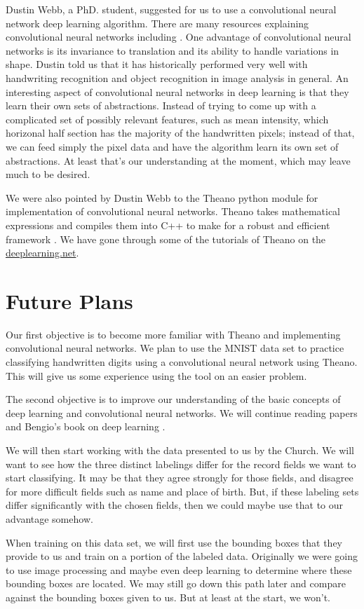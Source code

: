 \documentclass[12pt]{article}
\begin{document}
Dustin Webb, a PhD. student, suggested for us to use a convolutional neural network deep learning algorithm.  There are many resources explaining convolutional neural networks including \cite{Bengio-et-al-2015-Book} \cite{kavukcuoglu2010learning} \cite{krizhevsky2012imagenet}.  One advantage of convolutional neural networks is its invariance to translation and its ability to handle variations in shape.  Dustin told us that it has historically performed very well with handwriting recognition and object recognition in image analysis in general.  An interesting aspect of convolutional neural networks in deep learning is that they learn their own sets of abstractions.  Instead of trying to come up with a complicated set of possibly relevant features, such as mean intensity, which horizonal half section has the majority of the handwritten pixels; instead of that, we can feed simply the pixel data and have the algorithm learn its own set of abstractions.  At least that's our understanding at the moment, which may leave much to be desired.

We were also pointed by Dustin Webb to the Theano python module for implementation of convolutional neural networks.  Theano takes mathematical expressions and compiles them into C++ to make for a robust and efficient framework \cite{bergstra+al:2010-scipy}.  We have gone through some of the tutorials of Theano on the \href{http://www.deeplearning.net}{deeplearning.net}.

\section{Future Plans}

Our first objective is to become more familiar with Theano and implementing convolutional neural networks.  We plan to use the MNIST data set to practice classifying handwritten digits using a convolutional neural network using Theano.  This will give us some experience using the tool on an easier problem.

The second objective is to improve our understanding of the basic concepts of deep learning and convolutional neural networks.  We will continue reading papers and Bengio's book on deep learning \cite{Bengio-et-al-2015-Book}.

We will then start working with the data presented to us by the Church.  We will want to see how the three distinct labelings differ for the record fields we want to start classifying.  It may be that they agree strongly for those fields, and disagree for more difficult fields such as name and place of birth.  But, if  these labeling sets differ significantly with the chosen fields, then we could maybe use that to our advantage somehow.

When training on this data set, we will first use the bounding boxes that they provide to us and train on a portion of the labeled data.  Originally we were going to use image processing and maybe even deep learning to determine where these bounding boxes are located.  We may still go down this path later and compare against the bounding boxes given to us.  But at least at the start, we won't.




\end{document}
